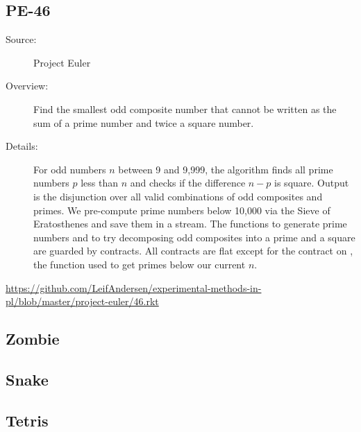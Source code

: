\subsection*{PE-46~\hrulefill}
\begin{description}
\item[Source:] Project Euler
\item[Overview:]
  Find the smallest odd composite number that cannot be written as the sum of a prime number and twice a square number.
\item[Details:] 
  For odd numbers $n$ between 9 and 9,999, the algorithm finds all prime numbers $p$ less than $n$ and checks if the difference $n - p$ is square.
  Output is the  disjunction over all valid combinations of odd composites and primes.
  We pre-compute prime numbers below 10,000 via the Sieve of Eratosthenes and save them in a stream.
  The functions to generate prime numbers and to try decomposing odd composites into a prime and a square are guarded by contracts.
  All contracts are flat except for the contract on , the function used to get primes below our current $n$.
\end{description}
\url{https://github.com/LeifAndersen/experimental-methods-in-pl/blob/master/project-euler/46.rkt}

\subsection*{Zombie~\hrulefill}
\subsection*{Snake~\hrulefill}
\subsection*{Tetris~\hrulefill}

